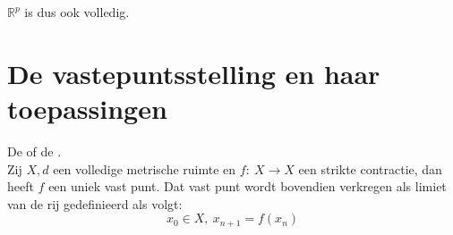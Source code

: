 \documentclass[main.tex]{subfiles}
\begin{document}
\begin{gev}
  $\mathbb{R}^{p}$ is dus ook volledig.
\end{gev}


\section{De vastepuntsstelling en haar toepassingen}
\label{sec:vastepuntsstelling}

\begin{bst}
  De  of de .\\
  Zij $X,d$ een volledige metrische ruimte en $f:\ X \rightarrow X$ een strikte contractie, dan heeft $f$ een uniek vast punt.
  Dat vast punt wordt bovendien verkregen als limiet van de rij gedefinieerd als volgt:
  \[ x_{0}\in X,\ x_{n+1} = f(x_{n}) \]


\end{bst}
\end{document}
